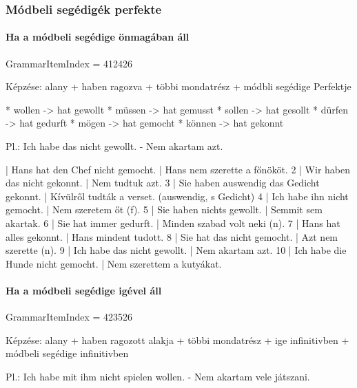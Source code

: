 \documentclass{article}
\newenvironment{desc}{\verbatim}{\endverbatim}
\newenvironment{exmp}{\verbatim}{\endverbatim}
\begin{document}
\subsubsection{Módbeli segédigék perfekte}

\paragraph{Ha a módbeli segédige önmagában áll}

GrammarItemIndex = 412426

\begin{desc}
Képzése:
alany + haben ragozva + többi mondatrész + módbli segédige Perfektje

* wollen -> hat gewollt
* müssen -> hat gemusst
* sollen -> hat gesollt
* dürfen -> hat gedurft
* mögen -> hat gemocht
* können -> hat gekonnt

Pl.: Ich habe das nicht gewollt. - Nem akartam azt.
\end{desc}

\begin{exmp}
1 | Hans hat den Chef nicht gemocht. | Hans nem szerette a főnököt.
2 | Wir haben das nicht gekonnt. | Nem tudtuk azt.
3 | Sie haben auswendig das Gedicht gekonnt. | Kívülről tudták a verset. (auswendig, s Gedicht)
4 | Ich habe ihn nicht gemocht. | Nem szeretem őt (f).
5 | Sie haben nichts gewollt. | Semmit sem akartak.
6 | Sie hat immer gedurft. | Minden szabad volt neki (n).
7 | Hans hat alles gekonnt. | Hans mindent tudott.
8 | Sie hat das nicht gemocht. | Azt nem szerette (n).
9 | Ich habe das nicht gewollt. | Nem akartam azt.
10 | Ich habe die Hunde nicht gemocht. | Nem szerettem a kutyákat.
\end{exmp}

\paragraph{Ha a módbeli segédige igével áll}

GrammarItemIndex = 423526

\begin{desc}
Képzése:
alany + haben ragozott alakja + többi mondatrész + ige infinitivben + módbeli segédige infinitivben

Pl.: Ich habe mit ihm nicht spielen wollen. - Nem akartam vele játszani.
\end{desc}
\end{document}

